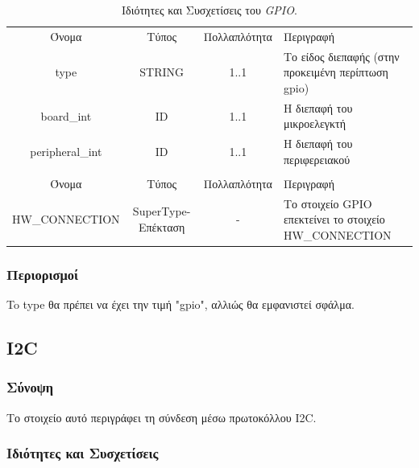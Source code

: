\begin{table}[H]
	\begin{center}
		\begin{tabular}{ | c | c | c| m{5.5cm} | }
			\hline
			\rowcolor{Gray}
			\multicolumn{4}{|c|}{\textbf{Ιδιότητες}}\\
			\hline
			\rowcolor{Gray}
			Όνομα & Τύπος & Πολλαπλότητα & Περιγραφή \\
			\hline
			type & STRING & 1..1 & Το είδος διεπαφής (στην προκειμένη περίπτωση gpio) \\
			\hline
			board\_int & ID & 1..1 & Η διεπαφή του μικροελεγκτή \\
			\hline
			peripheral\_int & ID & 1..1 & Η διεπαφή του περιφερειακού \\
			\hline
			\rowcolor{Gray}
			\multicolumn{4}{|c|}{\textbf{Συσχετίσεις}}\\
			\hline
			\rowcolor{Gray}
			Όνομα & Τύπος & Πολλαπλότητα & Περιγραφή \\
			\hline
			\footnotesize{HW\_CONNECTION} & SuperType-Επέκταση & - &  Το στοιχείο GPIO επεκτείνει το στοιχείο HW\_CONNECTION \\
			\hline
		\end{tabular}
		\caption{Ιδιότητες και Συσχετίσεις του \textit{GPIO}.}
		\label{tab:gpio_con}
	\end{center}
\end{table}

\subsubsection*{Περιορισμοί}

\noindent To type θα πρέπει να έχει την τιμή "gpio", αλλιώς θα εμφανιστεί σφάλμα.

\subsection{I2C}
\label{subsec:i2c_con}

\subsubsection*{Σύνοψη}

\noindent Το στοιχείο αυτό περιγράφει τη σύνδεση μέσω πρωτοκόλλου I2C.

\subsubsection*{Ιδιότητες και Συσχετίσεις}

